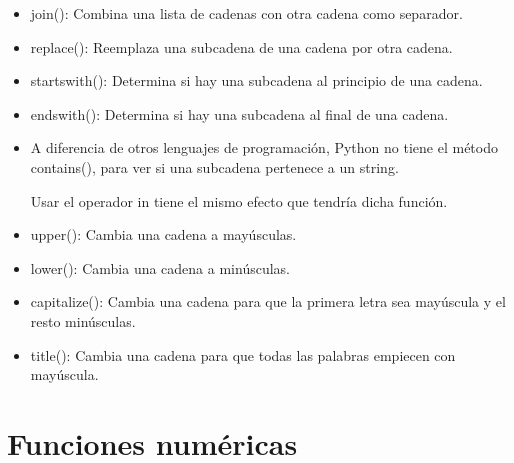 \documentclass{report}
\begin{document}
\begin{itemize}
  \item join(): Combina una lista de cadenas con otra cadena como separador.
  

  \item replace(): Reemplaza una subcadena de una cadena por otra cadena.


  \item startswith(): Determina si hay una subcadena al principio de una cadena.


  \item endswith(): Determina si hay una subcadena al final de una cadena.
  

  \item A diferencia de otros lenguajes de programación, Python no tiene el método contains(), para ver si una subcadena pertenece a un string.
  
  Usar el operador in tiene el mismo efecto que tendría dicha función.


  \item upper(): Cambia una cadena a mayúsculas.
  

  \item lower(): Cambia una cadena a minúsculas.
  

  \item capitalize(): Cambia una cadena para que la primera letra sea mayúscula y el resto minúsculas.

  
  \item title(): Cambia una cadena para que todas las palabras empiecen con mayúscula.
  

\end{itemize}

\section{Funciones numéricas}
\end{document}
